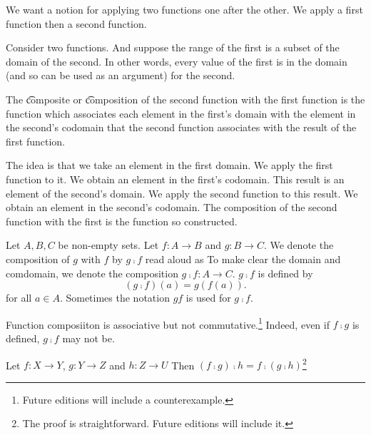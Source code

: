 

We want a notion for applying two functions one after the other.
We apply a first function then a second function.


Consider two functions.
And suppose the range of the first is a subset of the domain of the second.
In other words, every value of the first is in the domain (and so can be used as an argument) for the second.

The \t{composite} or \t{composition} of the second function with the first function is the function which associates each element in the first's domain with the element in the second's codomain that the second function associates with the result of the first function.

The idea is that we take an element in the first domain.
We apply the first function to it.
We obtain an element in the first's codomain.
This result is an element of the second's domain.
We apply the second function to this result.
We obtain an element in the second's codomain.
The composition of the second function with the first is the function so constructed.


Let $A, B, C$ be non-empty sets.
Let $f: A \to B$ and $g: B \to C$.
We denote the composition of $g$ with $f$ by $g \comp f$ read aloud as 
To make clear the domain and comdomain, we denote the composition $g \comp f: A \to C$.
$g \comp f$ is defined by
\[
  (g \comp f)(a) = g(f(a)).
\]
for all $a \in A$.
Sometimes the notation $gf$ is used for $g \comp f$.



Function composiiton is associative but not commutative.\footnote{Future editions will include a counterexample.}
Indeed, even if $f \comp g$ is defined, $g \comp f$ may not be.

\begin{proposition}[Associative]
Let $f: X \to Y$, $g: Y \to Z$ and $h: Z \to U$
Then $(f \comp g) \comp h = f \comp (g \comp h)$\footnote{The proof is straightforward. Future editions will include it.}
\end{proposition}
